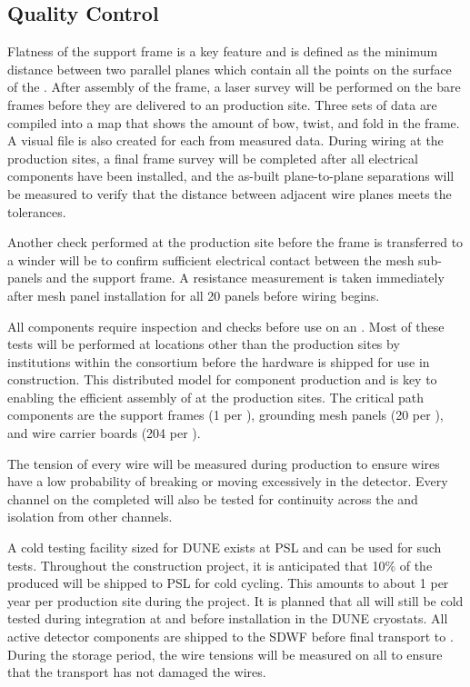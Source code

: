\subsection{ Quality Control}

Flatness of the  support frame is a key feature and is
defined as the minimum distance between two parallel planes which
contain all the points on the surface of the . After
assembly of the  frame, a laser survey will be performed on
the bare frames before they are delivered to an 
production site. Three sets of data are compiled into a map that shows
the amount of bow, twist, and fold in the frame. A visual file is also
created for each  from measured data. During 
wiring at the production sites, a final frame survey will be completed
after all electrical components have been installed, and the as-built
plane-to-plane separations will be measured to verify that the
distance between adjacent wire planes meets the tolerances.

Another check performed at the  production site before the
frame is transferred to a winder will be to confirm sufficient
electrical contact between the mesh sub-panels and the 
support frame. A resistance measurement is taken immediately after
mesh panel installation for all 20 panels before wiring begins.

All components require inspection and  checks before use on an
. Most of these tests will be performed at locations other than the
 production sites by institutions within the consortium before the
hardware is shipped for use in  construction. This distributed
model for component production and  is key to enabling the efficient
assembly of  at the production sites. The critical path components
are the support frames (1 per ), grounding mesh panels (20 per
), and wire carrier boards (204 per ).

The tension of every wire will be measured during production to ensure
wires have a low probability of breaking or moving excessively in the
detector. Every channel on the completed  will also be tested for
continuity across the  and isolation from other channels.

A cold testing facility sized for DUNE  exists at PSL and can be
used for such tests. Throughout the construction project, it is
anticipated that 10\% of the produced  will be shipped to PSL for
cold cycling. This amounts to about 1  per year per production site
during the project. It is planned that all  will still be cold
tested during integration at  and before installation in the DUNE
cryostats. All active detector components are shipped to the SDWF
before final transport to . During the storage period, the wire
tensions will be measured on all  to ensure that the transport has
not damaged the wires.

